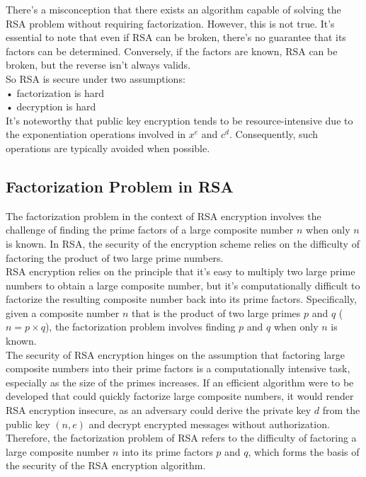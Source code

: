 \documentclass[11pt]{article}
\begin{document}
There's a misconception that there exists an algorithm capable of solving the RSA problem without requiring factorization. However, this is not true. It's essential to note that even if RSA can be broken, there's no guarantee that its factors can be determined. Conversely, if the factors are known, RSA can be broken, but the reverse isn't always valids.\\
 So RSA is secure under two assumptions:\\
• factorization is hard\\
• decryption is hard\\
It's noteworthy that public key encryption tends to be resource-intensive due to the exponentiation operations involved in $x^e$ and $c^d$. Consequently, such operations are typically avoided when possible.

\subsection*{Factorization Problem in RSA}

The factorization problem in the context of RSA encryption involves the challenge of finding the prime factors of a large composite number $n$ when only $n$ is known. In RSA, the security of the encryption scheme relies on the difficulty of factoring the product of two large prime numbers.\\

RSA encryption relies on the principle that it's easy to multiply two large prime numbers to obtain a large composite number, but it's computationally difficult to factorize the resulting composite number back into its prime factors. Specifically, given a composite number $n$ that is the product of two large primes $p$ and $q$ ($n = p \times q$), the factorization problem involves finding $p$ and $q$ when only $n$ is known.\\

The security of RSA encryption hinges on the assumption that factoring large composite numbers into their prime factors is a computationally intensive task, especially as the size of the primes increases. If an efficient algorithm were to be developed that could quickly factorize large composite numbers, it would render RSA encryption insecure, as an adversary could derive the private key $d$ from the public key $(n, e)$ and decrypt encrypted messages without authorization.\\

Therefore, the factorization problem of RSA refers to the difficulty of factoring a large composite number $n$ into its prime factors $p$ and $q$, which forms the basis of the security of the RSA encryption algorithm.
\end{document}
